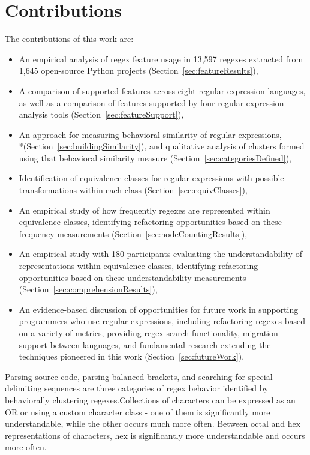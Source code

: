 \section{Contributions}

The contributions of this work are:
\begin{itemize} \setlength \itemsep{.1pt}
    \item An empirical analysis of regex feature usage in 13,597 regexes extracted from 1,645 open-source Python projects (Section~\ref{sec:featureResults}),
    \item A comparison of supported features across eight regular expression languages, as well as a comparison of features supported by four regular expression analysis tools (Section~\ref{sec:featureSupport}),
    \item An approach for measuring behavioral similarity of regular expressions, \\*(Section~\ref{sec:buildingSimilarity}), and qualitative analysis of clusters formed using that behavioral similarity measure (Section~\ref{sec:categoriesDefined}),
    \item Identification of equivalence classes for regular expressions with possible transformations within each class (Section~\ref{sec:equivClasses}),
    \item An empirical study of how frequently regexes are represented within equivalence classes, identifying refactoring opportunities based on these frequency measurements (Section~\ref{sec:nodeCountingResults}),
    \item An empirical study with 180 participants evaluating the understandability of representations within equivalence classes, identifying refactoring opportunities based on these understandability measurements (Section~\ref{sec:comprehensionResults}),
    \item An evidence-based discussion of opportunities for future work in supporting programmers who use regular expressions, including refactoring regexes based on a variety of metrics, providing regex search functionality, migration support between languages, and fundamental research extending the techniques pioneered in this work (Section~\ref{sec:futureWork}).
\end{itemize}

Parsing source code, parsing balanced brackets, and searching for special delimiting sequences are three categories of regex behavior identified by behaviorally clustering regexes.Collections of characters can be expressed as an OR or using a custom character class - one of them is significantly more understandable, while the other occurs much more often. Between octal and hex representations of characters, hex is significantly more understandable and occurs more often.
